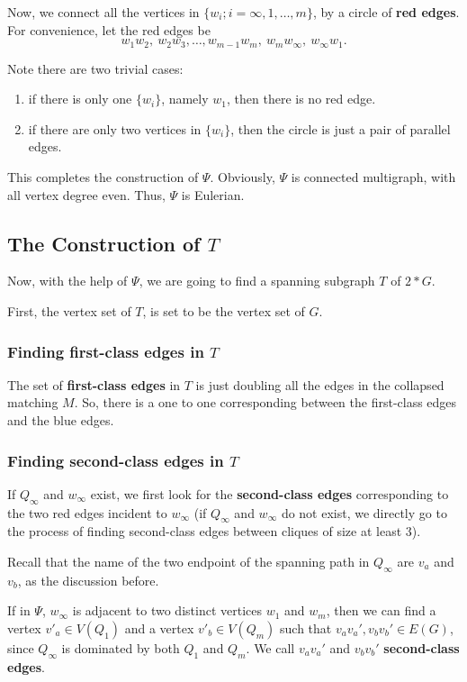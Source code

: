 \documentclass{amsart}
\theoremstyle{definition}
\begin{document}
Now, we connect all the vertices in $\{w_i;i=\infty,1,\ldots,m\}$, by a circle of {\bf red edges}. For convenience, let the red edges be $$w_1w_2,~w_2w_3,\ldots,w_{m-1}w_m,~w_mw_{\infty},~w_{\infty}w_1.$$

 Note there are two trivial cases:
\begin{enumerate}
\item if there is only one $\{w_i\}$, namely $w_1$, then there is no red edge.
\item if there are only two vertices in $\{w_i\}$, then the circle is just a pair of parallel edges.
\end{enumerate}

This completes the construction of $\Psi$. Obviously, $\Psi$ is connected
multigraph, with all vertex degree even. Thus, $\Psi$ is Eulerian.


\subsection{The Construction of $T$}
Now, with the help of $\Psi$, we are going to find a spanning subgraph $T$ of $2*G$.

First, the vertex set of $T$, is set to be the vertex set of $G$.

\subsubsection{
Finding first-class edges in $T$}
The set of {\bf first-class edges} in $T$ is just doubling all the edges in the collapsed matching $M$. So, there is a one to one corresponding between the first-class edges and the blue edges.



\subsubsection{
Finding second-class edges in $T$}
If $Q_{\infty}$ and $w_{\infty}$ exist, we first look for the {\bf second-class edges} corresponding to the two red edges incident to $w_{\infty}$ (if $Q_{\infty}$ and $w_{\infty}$ do not exist, we directly go to the process of finding second-class edges between cliques of size at least 3).


Recall that the name of the two endpoint of the spanning path in $Q_{\infty}$ are $v_a$ and $v_b$, as the discussion before.

If in $\Psi$, $w_{\infty}$ is adjacent to two distinct vertices $w_1$ and $w_m$, then we can find a vertex $v'_a\in V(Q_1)$ and a vertex $v'_b\in V(Q_m)$ such that $v_av_a',v_bv_b'\in E(G)$, since $Q_{\infty}$ is dominated by both $Q_1$ and $Q_m$. We call $v_av_a'$ and $v_bv_b'$ {\bf second-class edges}.
\end{document}
